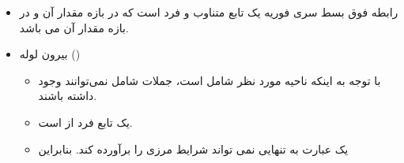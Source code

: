 \begin{ELexample}{}
\begin{ELsolution}
\begin{itemize}
\tightlist
\item
  رابطه فوق بسط سری فوریه یک تابع متناوب و فرد است که در بازه  مقدار آن  و در بازه \ELim{\pi<\phi<2\pi} مقدار آن  می باشد.
\end{itemize}


\begin{itemize}
\tightlist
\item
  بیرون لوله ()

  \begin{itemize}
  \tightlist
  \item
    با توجه به اینکه ناحیه مورد نظر شامل  است، جملات شامل  نمی‌توانند وجود داشته باشند.
  \item
     یک تابع فرد از \ELim{\phi} است.
  \item
    یک عبارت به تنهایی نمی تواند شرایط مرزی را برآورده کند. بنابراین
  \end{itemize}
\end{itemize}


\begin{ELimportant}{}


\end{ELimportant}

\end{ELsolution}

\end{ELexample}
